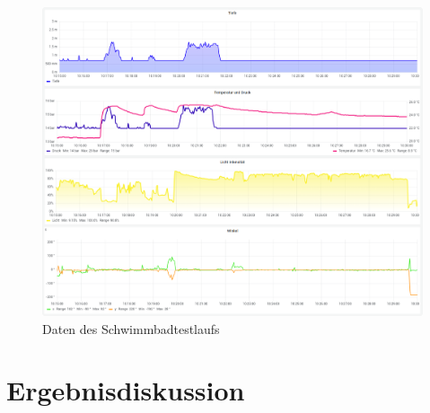 \documentclass[11pt]{article}
\begin{document}
\endgroup
\vspace{4cm}
\begin{figure}[htb]
\centering
  \includegraphics[width=\linewidth]{data.png}
  \caption{Daten des Schwimmbadtestlaufs}
\end{figure}

\newpage
\section{Ergebnisdiskussion}
\Ergebnisdiskussion

\newpage
\end{document}
